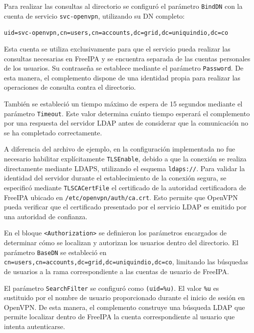 Para realizar las consultas al directorio se configuró el parámetro \texttt{BindDN} con la cuenta de servicio \texttt{svc-openvpn}, utilizando su \ac{DN} completo:

\begin{center}
	\texttt{uid=svc-openvpn,cn=users,cn=accounts,dc=grid,dc=uniquindio,dc=co}
\end{center}

Esta cuenta se utiliza exclusivamente para que el servicio pueda realizar las consultas necesarias en FreeIPA y se encuentra separada de las cuentas personales de los usuarios. Su contraseña se establece mediante el parámetro \texttt{Password}. De esta manera, el complemento dispone de una identidad propia para realizar las operaciones de consulta contra el directorio.

También se estableció un tiempo máximo de espera de 15 segundos mediante el parámetro \texttt{Timeout}. Este valor determina cuánto tiempo esperará el complemento por una respuesta del servidor \ac{LDAP} antes de considerar que la comunicación no se ha completado correctamente.

A diferencia del archivo de ejemplo, en la configuración implementada no fue necesario habilitar explícitamente \texttt{TLSEnable}, debido a que la conexión se realiza directamente mediante \ac{LDAPS}, utilizando el esquema \texttt{ldaps://}. Para validar la identidad del servidor durante el establecimiento de la conexión segura, se especificó mediante \texttt{TLSCACertFile} el certificado de la autoridad certificadora de FreeIPA ubicado en \texttt{/etc/openvpn/auth/ca.crt}. Esto permite que OpenVPN pueda verificar que el certificado presentado por el servicio \ac{LDAP} es emitido por una autoridad de confianza.

En el bloque \texttt{<Authorization>} se definieron los parámetros encargados de determinar cómo se localizan y autorizan los usuarios dentro del directorio. El parámetro \texttt{BaseDN} se estableció en \texttt{cn=users,cn=accounts,dc=grid,dc=uniquindio,dc=co}, limitando las búsquedas de usuarios a la rama correspondiente a las cuentas de usuario de FreeIPA.

El parámetro \texttt{SearchFilter} se configuró como \texttt{(uid=\%u)}. El valor \texttt{\%u} es sustituido por el nombre de usuario proporcionado durante el inicio de sesión en OpenVPN. De esta manera, el complemento construye una búsqueda \ac{LDAP} que permite localizar dentro de FreeIPA la cuenta correspondiente al usuario que intenta autenticarse.

